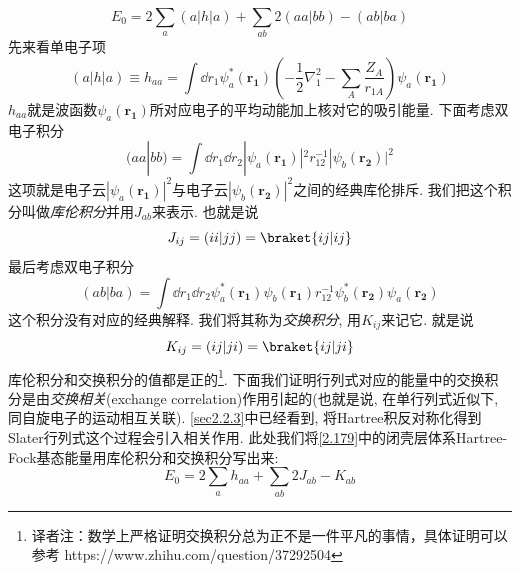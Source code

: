 \begin{equation}
\label{2.179}
E_0 = 2 \sum_{a}(a|h|a) + \sum_{ab}2(aa|bb) - (ab|ba)
\end{equation}
先来看单电子项
\begin{equation}
(a|h|a) \equiv h_{aa} = \int\dd{r_1}\psi_a^*(\mathbf{r_1})\left( -\frac{1}{2}\nabla_1^2 - \sum_A\frac{Z_A}{r_{1A}} \right)\psi_a(\mathbf{r_1})
\end{equation}
$h_{aa}$就是波函数$\psi_a(\mathbf{r_1})$所对应电子的平均动能加上核对它的吸引能量. 下面考虑双电子积分
\begin{equation}
(aa|bb) = \int\dd{r_1}\dd{r_2}|\psi_a(\mathbf{r_1})|^2r_{12}^{-1}|\psi_b(\mathbf{r_2})|^2
\end{equation}
这项就是电子云$|\psi_a(\mathbf{r_1})|^2$与电子云$|\psi_b(\mathbf{r_2})|^2$之间的经典库伦排斥. 
我们把这个积分叫做\emph{库伦积分}并用$J_{ab}$来表示. 
也就是说
\begin{equation}
J_{ij} = (ii|jj) = \braket{ij|ij}
\end{equation} 
最后考虑双电子积分
\begin{equation}
(ab|ba) = \int\dd{r_1}\dd{r_2} \psi_a^*(\mathbf{r_1})\psi_b(\mathbf{r_1}) r_{12}^{-1} \psi_b^*(\mathbf{r_2}) \psi_a(\mathbf{r_2})
\end{equation}
这个积分没有对应的经典解释. 
我们将其称为\emph{交换积分}, 
用$K_{ij}$来记它. 
就是说
\begin{equation}
K_{ij} = (ij|ji) = \braket{ij|ji}
\end{equation}
库伦积分和交换积分的值都是正的\footnote{译者注：数学上严格证明交换积分总为正不是一件平凡的事情，具体证明可以参考 https://www.zhihu.com/question/37292504}. 
下面我们证明行列式对应的能量中的交换积分是由\emph{交换相关}(exchange correlation)作用引起的(也就是说,
在单行列式近似下, 
同自旋电子的运动相互关联). 
\autoref{sec2.2.3}中已经看到, 
将Hartree积反对称化得到Slater行列式这个过程会引入相关作用. 
此处我们将\autoref{2.179}中的闭壳层体系Hartree-Fock基态能量用库伦积分和交换积分写出来:
\begin{equation}
E_0 = 2\sum_a h_{aa} + \sum_{ab}2J_{ab} - K_{ab} 
\end{equation}

